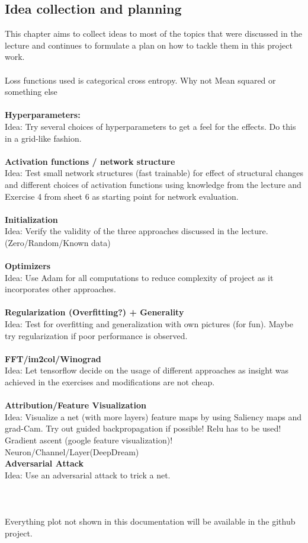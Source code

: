 \documentclass{article}
\begin{document}
\begin{multicols}{2}
\section{Idea collection and planning}
\label{ideas}
This chapter aims to collect ideas to most of the topics that were discussed in the lecture and continues to formulate a plan on how to tackle them in this project work.\\
\\
Loss functions used is categorical cross entropy. Why not Mean squared or something else\\
\\
\textbf{Hyperparameters:}\\
Idea: Try several choices of hyperparameters to get a feel for the effects. Do this in a grid-like fashion.\\
\\
\textbf{Activation functions / network structure}\\
Idea: Test small network structures (fast trainable) for effect of structural changes and different choices of activation functions using knowledge from the lecture and Exercise 4 from sheet 6 as starting point for network evaluation.\\
\\
\textbf{Initialization}\\
Idea: Verify the validity of the three approaches discussed in the lecture. (Zero/Random/Known data)\\
\\
\textbf{Optimizers}\\
Idea: Use Adam for all computations to reduce complexity of project as it incorporates other approaches.\\
\\
\textbf{Regularization (Overfitting?) + Generality}\\
Idea: Test for overfitting and generalization with own pictures (for fun). Maybe try regularization if poor performance is observed.\\
\\
\textbf{FFT/im2col/Winograd}\\
Idea: Let tensorflow decide on the usage of different approaches as insight was achieved in the exercises and modifications are not cheap.\\
\\
\textbf{Attribution/Feature Visualization}\\
Idea: Visualize a net (with more layers) feature maps by using Saliency maps and grad-Cam. Try out guided backpropagation if possible! Relu has to be used! Gradient ascent (google feature visualization)!\\
Neuron/Channel/Layer(DeepDream)
\\
\textbf{Adversarial Attack}\\
Idea: Use an adversarial attack to trick a net.\\
\\
\\
\\
Everything plot not shown in this documentation will be available in the github project.


\end{multicols}
\end{document}

